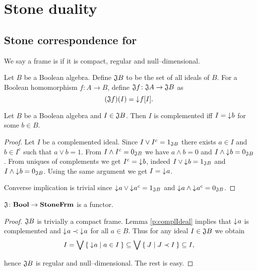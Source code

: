 \chapter{Stone duality}
\section{Stone correspondence for \StoneFrm}

\begin{definition}
    We say a frame is  if it is compact, regular and null--dimensional.
\end{definition}

\begin{definition}
    Let $B$ be a Boolean algebra. Define $\DEFSYM{J}{\J} B$ to be the set of all ideals of $B$.
    For a Boolean homomorphism $f\colon A \to B$, define $\mathfrak{J} f\colon \mathfrak{J} A \to \mathfrak{J} B$ as
    $$(\mathfrak{J} f)(I) = \mathord{\downarrow}\mkern1mu f[I].$$
\end{definition}

\begin{lemma}\label{p:complIdeal}
    Let $B$ be a Boolean algebra and $I \in \mathfrak{J} B$. Then $I$ is complemented iff $I = \mathord{\downarrow}\mkern1mu b$ for some $b \in B$.
\end{lemma}
\begin{proof}
    Let $I$ be a complemented ideal. Since $I \vee I^c = 1_{\mathfrak{J} B}$ there exists $a \in I$ and $b \in I^c$ such that $a \vee b = 1$. From $I \wedge I^c = 0_{\mathfrak{J} B}$ we have $a \wedge b = 0$ and $I \wedge \mathord{\downarrow}\mkern1mu b = 0_{\mathfrak{J} B}$.
    From uniques of complements we get $I^c = \mathord{\downarrow}\mkern1mu b$, indeed $I \vee \mathord{\downarrow}\mkern1mu b = 1_{\mathfrak{J} B}$ and $I \wedge \mathord{\downarrow}\mkern1mu b = 0_{\mathfrak{J} B}$. Using the same argument we get $I = \mathord{\downarrow}\mkern1mu a$.

    Converse implication is trivial since $\mathord{\downarrow}\mkern1mu a \vee \mathord{\downarrow}\mkern1mu a^c = 1_{\mathfrak{J} B}$ and $\mathord{\downarrow}\mkern1mu a \wedge \mathord{\downarrow}\mkern1mu a^c = 0_{\mathfrak{J} B}$.
\end{proof}

\begin{proposition}\label{p:JisFunctor}
    $\mathfrak{J}\colon \mathbf{Bool} \to \mathbf{StoneFrm}$ is a functor.
\end{proposition}
\begin{proof}
    $\mathfrak{J} B$ is trivially a compact frame. Lemma \ref{p:complIdeal} implies that $\mathord{\downarrow}\mkern1mu a$ is complemented and $\mathord{\downarrow}\mkern1mu a \prec \mathord{\downarrow}\mkern1mu a$ for all $a \in B$. Thus for any ideal $I \in \mathfrak{J} B$ we obtain
    $$ I = \bigvee \Set{ \mathord{\downarrow}\mkern1mua | a \in I } \subseteq \bigvee \Set{ J | J \prec I } \subseteq I,$$

\noindent hence $\mathfrak{J} B$ is regular and null--dimensional. The rest is easy.
\end{proof}

